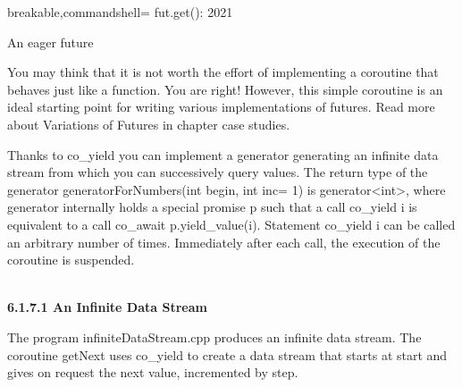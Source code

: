 \begin{tcblisting}{breakable,commandshell={}}
fut.get(): 2021
\end{tcblisting}

\begin{center}
An eager future
\end{center}

You may think that it is not worth the effort of implementing a coroutine that behaves just like a function. You are right! However, this simple coroutine is an ideal starting point for writing various implementations of futures. Read more about Variations of Futures in chapter case studies.


Thanks to co\_yield you can implement a generator generating an infinite data stream from which you can successively query values. The return type of the generator generatorForNumbers(int begin, int inc= 1) is generator<int>, where generator internally holds a special promise p such that a call co\_yield i is equivalent to a call co\_await p.yield\_value(i). Statement co\_yield i can be called an arbitrary number of times. Immediately after each call, the execution of the coroutine is suspended.

\hspace*{\fill} \\ %
\noindent
\textbf{6.1.7.1\hspace{0.2cm} An Infinite Data Stream}

The program infiniteDataStream.cpp produces an infinite data stream. The coroutine getNext uses co\_yield to create a data stream that starts at start and gives on request the next value, incremented by step.

